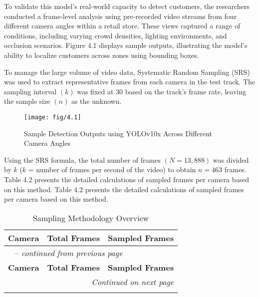 {To validate this model’s real-world capacity to detect customers, the researchers conducted a frame-level analysis using pre-recorded video streams from four different camera angles within a retail store. These views captured a range of conditions, including varying crowd densities, lighting environments, and occlusion scenarios. Figure 4.1 displays sample outputs, illustrating the model's ability to localize customers across zones using bounding boxes.

To manage the large volume of video data, Systematic Random Sampling (SRS) was used to extract representative frames from each camera in the test track. The sampling interval $(k)$ was fixed at 30 based on the track’s frame rate, leaving the sample size $(n)$ as the unknown.

\begin{figure}[H]
	\caption[Sample Detection Outputs using YOLOv10x Across Different Camera Angles]{\newline \newline Sample Detection Outputs using YOLOv10x Across Different Camera Angles}
	\centering
	\texttt{[image: fig/4.1]}
	\label{fig:4.1}
\end{figure}

Using the SRS formula, the total number of frames $(N = 13, 888)$ was divided by $k$ ($k$ = number of frames per second of the video) to obtain $n = 463$ frames. Table 4.2 presents the detailed calculations of sampled frames per camera based on this method. Table 4.2 presents the detailed calculations of sampled frames per camera based on this method.


{\doublespacing
	\begin{longtable}{|p{4cm}|p{5cm}|p{5cm}|}
		\caption[Sampling Methodology Overview]{\newline \newline Sampling Methodology Overview} \label{tab:sampling} \\
		\hline
		\textbf{Camera} & \textbf{Total Frames} & \textbf{Sampled Frames} \\
		\hline
		\endfirsthead
		
		\multicolumn{3}{l}{\tablename\ \thetable{} -- \textit{continued from previous page}} \\
		\hline
		\textbf{Camera} & \textbf{Total Frames} & \textbf{Sampled Frames} \\
		\hline
		\endhead
		
		\hline \multicolumn{3}{|r|}{\textit{Continued on next page}} \\ \hline
		\endfoot
		

\end{longtable}}}
